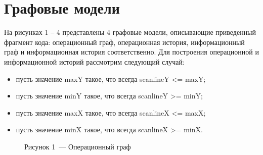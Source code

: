 \documentclass[12pt, a4paper]{report}
\begin{document}
	\chapter*{Графовые модели}
	
	На рисунках 1 -- 4 представлены 4 графовые модели, описывающие приведенный фрагмент кода: операционный граф, операционная история, информационный граф и информационная история соответственно. Для построения операционной и информационной историй рассмотрим следующий случай:
	
	\begin{itemize}
	\item пусть значение maxY такое, что всегда scanlineY <= maxY;
	\item пусть значение minY такое, что всегда scanlineY >= minY;
	\item пусть значение maxX такое, что всегда scanlineX <= maxX;
	\item пусть значение minX такое, что всегда scanlineX >= minX.
	\end{itemize}
	
	\begin{figure}[H]
		\caption*{Рисунок 1~--- Операционный граф}
	\end{figure}
\end{document}

